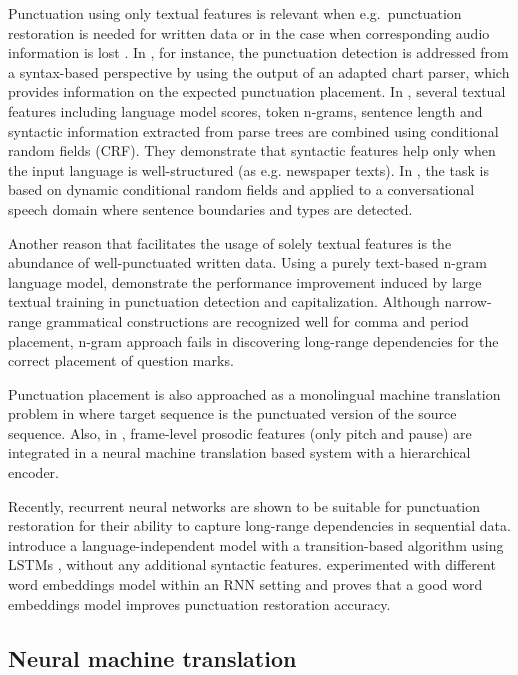 Punctuation using only textual features is relevant when e.g.~punctuation restoration is needed for written data \citep{jakubicek2010punctuation} or in the case when corresponding audio information is lost \citep{lu2010better}. In \cite{jakubicek2010punctuation}, for instance, the punctuation detection is addressed from a syntax-based perspective by using the output of an adapted chart parser, which provides information on the expected punctuation placement. In \cite{ueffing2013improved}, several textual features including language model scores, token n-grams, sentence length and syntactic information extracted from parse trees are combined using conditional random fields (CRF). They demonstrate that syntactic features help only when the input language is well-structured (as e.g. newspaper texts). In \cite{lu2010better}, the task is based on dynamic conditional random fields and applied to a conversational speech domain where sentence boundaries and types are detected. 

Another reason that facilitates the usage of solely textual features is the abundance of well-punctuated written data. Using a purely text-based n-gram language model, \cite{Gravano} demonstrate the performance improvement induced by large textual training in punctuation detection and capitalization. Although narrow-range grammatical constructions are recognized well for comma and period placement, n-gram approach fails in discovering long-range dependencies for the correct placement of question marks. 

Punctuation placement is also approached as a monolingual machine translation problem in \cite{peitz2011modeling, Cho2017NMTbasedSA, Paulik} where target sequence is the punctuated version of the source sequence. Also, in \cite{Klejch}, frame-level prosodic features (only pitch and pause) are integrated in a neural machine translation based system with a hierarchical encoder.  

Recently, recurrent neural networks are shown to be suitable for punctuation restoration for their ability to capture long-range dependencies in sequential data. \cite{ballesterosneural} introduce a language-independent model with a transition-based algorithm using LSTMs \citep{lstm}, without any additional syntactic features. \cite{Treviso} experimented with different word embeddings model within an RNN setting and proves that a good word embeddings model improves punctuation restoration accuracy. 

\subsection{Neural machine translation}
\label{sota:nmt}

